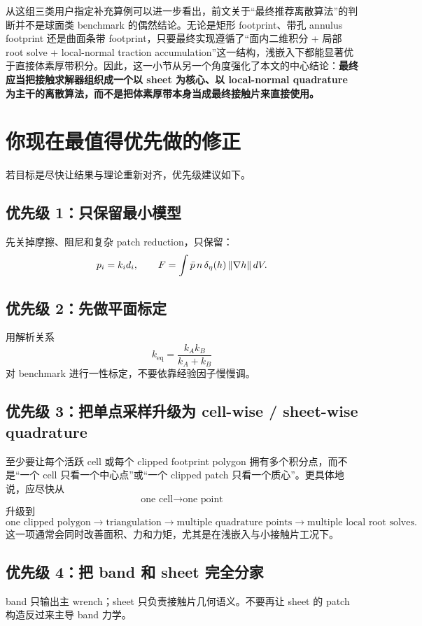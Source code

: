 \documentclass[12pt,a4paper]{ctexart}
\begin{document}
从这组三类用户指定补充算例可以进一步看出，前文关于“最终推荐离散算法”的判断并不是球面类 benchmark 的偶然结论。无论是矩形 footprint、带孔 annulus footprint 还是曲面条带 footprint，只要最终实现遵循了“面内二维积分 + 局部 root solve + local-normal traction accumulation”这一结构，浅嵌入下都能显著优于直接体素厚带积分。因此，这一小节从另一个角度强化了本文的中心结论：\textbf{最终应当把接触求解器组织成一个以 sheet 为核心、以 local-normal quadrature 为主干的离散算法，而不是把体素厚带本身当成最终接触片来直接使用。}


\section{你现在最值得优先做的修正}

若目标是尽快让结果与理论重新对齐，优先级建议如下。

\subsection{优先级 1：只保留最小模型}
先关掉摩擦、阻尼和复杂 patch reduction，只保留：
\begin{equation}
    p_i=k_i d_i,
    \qquad
    F = \int \bar p\,n\,\delta_\eta(h)\,\norm{\nabla h}\,dV.
\end{equation}

\subsection{优先级 2：先做平面标定}
用解析关系
\begin{equation}
    k_{\mathrm{eq}}=\frac{k_Ak_B}{k_A+k_B}
\end{equation}
对 benchmark 进行一性标定，不要依靠经验因子慢慢调。

\subsection{优先级 3：把单点采样升级为 cell-wise / sheet-wise quadrature}
至少要让每个活跃 cell 或每个 clipped footprint polygon 拥有多个积分点，而不是“一个 cell 只看一个中心点”或“一个 clipped patch 只看一个质心”。更具体地说，应尽快从
\[
    \text{one cell} \to \text{one point}
\]
升级到
\[
    \text{one clipped polygon} \to \text{triangulation} \to \text{multiple quadrature points} \to \text{multiple local root solves}.
\]
这一项通常会同时改善面积、力和力矩，尤其是在浅嵌入与小接触片工况下。

\subsection{优先级 4：把 band 和 sheet 完全分家}
band 只输出主 wrench；sheet 只负责接触片几何语义。不要再让 sheet 的 patch 构造反过来主导 band 力学。
\end{document}
